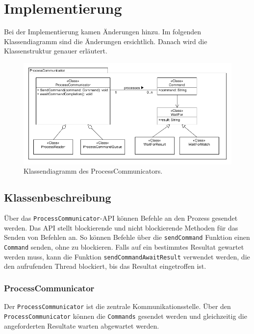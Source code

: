 \section{Implementierung}

Bei der Implementierung kamen Änderungen hinzu. Im folgenden Klassendiagramm sind die Änderungen ersichtlich. Danach wird die Klassenstruktur genauer erläutert.

\begin{figure}

	\centering
		\includegraphics[scale=0.75]{forthcommunication/communicator.png}
		\caption{Klassendiagramm des ProcessCommunicators.}
		\label{fig:communicator}

\end{figure}

\newpage

\subsection{Klassenbeschreibung}

Über das \verb!ProcessCommunicator!-API können Befehle an den Prozess gesendet werden. Das API stellt blockierende und nicht blockierende Methoden für das Senden von Befehlen an. So können Befehle über die \verb!sendCommand! Funktion einen \verb!Command! senden, ohne zu blockieren. Falls auf ein bestimmtes Resultat gewartet werden muss, kann die Funktion \verb!sendCommandAwaitResult! verwendet werden, die den aufrufenden Thread blockiert, bis das Resultat eingetroffen ist. 

\subsubsection{ProcessCommunicator}

Der \verb!ProcessCommunicator! ist die zentrale Kommunikationsstelle. Über den \\ \verb!ProcessCommunicator! können die \verb!Commands! gesendet werden und gleichzeitig die angeforderten Resultate warten abgewartet werden.

